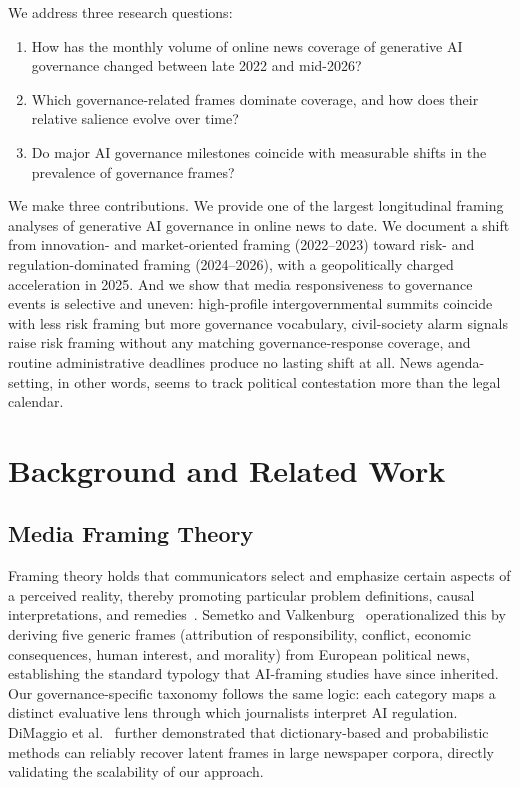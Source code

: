\documentclass[sigconf]{acmart}
\begin{document}
We address three research questions:
\begin{enumerate}
    \item[\textbf{RQ1.}] How has the monthly volume of online news coverage of generative AI governance changed between late 2022 and mid-2026?
    \item[\textbf{RQ2.}] Which governance-related frames dominate coverage, and how does their relative salience evolve over time?
    \item[\textbf{RQ3.}] Do major AI governance milestones coincide with measurable shifts in the prevalence of governance frames?
\end{enumerate}

We make three contributions.
We provide one of the largest longitudinal framing analyses of generative AI governance in online news to date.
We document a shift from innovation- and market-oriented framing (2022--2023) toward risk- and regulation-dominated framing (2024--2026), with a geopolitically charged acceleration in 2025.
And we show that media responsiveness to governance events is selective and uneven: high-profile intergovernmental summits coincide with less risk framing but more governance vocabulary, civil-society alarm signals raise risk framing without any matching governance-response coverage, and routine administrative deadlines produce no lasting shift at all. News agenda-setting, in other words, seems to track political contestation more than the legal calendar.

\section{Background and Related Work}

\subsection{Media Framing Theory}

Framing theory holds that communicators select and emphasize certain aspects of a perceived reality, thereby promoting particular problem definitions, causal interpretations, and remedies~\cite{entman_framing_1993}.
Semetko and Valkenburg~\cite{semetko_framing_2000} operationalized this by deriving five generic frames (attribution of responsibility, conflict, economic consequences, human interest, and morality) from European political news, establishing the standard typology that AI-framing studies have since inherited.
Our governance-specific taxonomy follows the same logic: each category maps a distinct evaluative lens through which journalists interpret AI regulation.
DiMaggio et al.~\cite{dimaggio_exploiting_2013} further demonstrated that dictionary-based and probabilistic methods can reliably recover latent frames in large newspaper corpora, directly validating the scalability of our approach.
\end{document}
